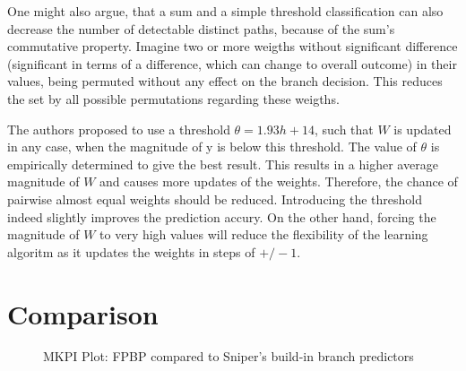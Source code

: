 \documentclass{article}
\begin{document}
One might also argue, that a sum and a simple threshold classification can also decrease the number of detectable distinct paths, because of the sum's commutative property. Imagine two or more weigths without significant  difference (significant in terms of a difference, which can change to overall outcome) in their values, being permuted without any effect on the branch decision. This reduces the set by all possible permutations regarding these weigths.

The authors proposed to use a threshold $\theta = 1.93 h + 14$, such that $W$ is updated in any case, when the magnitude of y is below this threshold. The value of $\theta$ is empirically determined to give the best result. This results in a higher average magnitude of $W$  and causes more updates of the weights. Therefore, the chance of pairwise almost equal weights should be reduced. Introducing the threshold indeed slightly improves the prediction accury. 
On the other hand, forcing the magnitude of $W$ to very high values will reduce the flexibility of the learning algoritm as it updates the weights in steps of $+/-1$.

\section{Comparison}
\begin{figure}
\caption{MKPI Plot: FPBP compared to Sniper's\cite{carlson2014aeohmcm} build-in branch predictors}
\end{figure}
\end{document}
